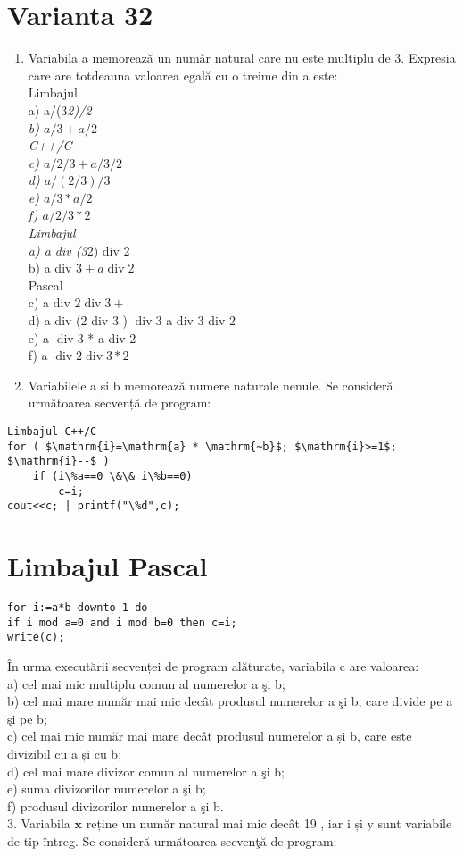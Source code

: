 \section*{Varianta 32}
\begin{enumerate}
  \item Variabila a memorează un număr natural care nu este multiplu de 3. Expresia care are totdeauna valoarea egală cu o treime din a este:\\
Limbajul\\
a) a/(3\textit{2)/2\\
b) $a / 3+a / 2$\\
C++/C\\
c) $a / 2 / 3+a / 3 / 2$\\
d) $a /(2 / 3) / 3$\\
e) $a / 3 * a / 2$\\
f) $a / 2 / 3 * 2$\\
Limbajul\\
a) a div (3}2) div 2\\
b) a div $3+a \operatorname{div} 2$\\
Pascal\\
c) a div $2 \operatorname{div} 3+$\\
d) a div (2 div 3 ) $\operatorname{div} 3$ a div 3 div 2\\
e) a $\operatorname{div} 3$ * a div 2\\
f) a $\operatorname{div} 2 \operatorname{div} 3 * 2$
  \item Variabilele a și b memorează numere naturale nenule. Se consideră următoarea secvență de program:
\end{enumerate}

\begin{verbatim}
Limbajul C++/C
for ( $\mathrm{i}=\mathrm{a} * \mathrm{~b}$; $\mathrm{i}>=1$; $\mathrm{i}--$ )
    if (i\%a==0 \&\& i\%b==0)
        c=i;
cout<<c; | printf("\%d",c);
\end{verbatim}

\section*{Limbajul Pascal}
\begin{verbatim}
for i:=a*b downto 1 do
if i mod a=0 and i mod b=0 then c=i;
write(c);
\end{verbatim}

În urma executării secvenței de program alăturate, variabila c are valoarea:\\
a) cel mai mic multiplu comun al numerelor a şi b;\\
b) cel mai mare număr mai mic decât produsul numerelor a şi b, care divide pe a şi pe b;\\
c) cel mai mic număr mai mare decât produsul numerelor a și b, care este divizibil cu a și cu b;\\
d) cel mai mare divizor comun al numerelor a şi b;\\
e) suma divizorilor numerelor a şi b;\\
f) produsul divizorilor numerelor a şi b.\\
3. Variabila $\mathbf{x}$ reține un număr natural mai mic decât 19 , iar i și y sunt variabile de tip întreg. Se consideră următoarea secvenţă de program:

